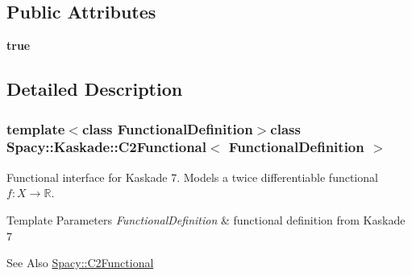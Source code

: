 \subsection*{Public Attributes}
\begin{DoxyCompactItemize}
\item 
{\bfseries true}
\end{DoxyCompactItemize}


\subsection{Detailed Description}
\subsubsection*{template$<$class Functional\-Definition$>$class Spacy\-::\-Kaskade\-::\-C2\-Functional$<$ Functional\-Definition $>$}

Functional interface for Kaskade 7. Models a twice differentiable functional $f:X\rightarrow \mathbb{R}$. 


\begin{DoxyTemplParams}{Template Parameters}
{\em Functional\-Definition} & functional definition from Kaskade 7 \\
\hline
\end{DoxyTemplParams}
\begin{DoxySeeAlso}{See Also}
\hyperlink{classSpacy_1_1C2Functional}{Spacy\-::\-C2\-Functional} 
\end{DoxySeeAlso}


